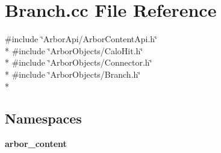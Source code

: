 \section{Branch.\+cc File Reference}
\label{Branch_8cc}
{\ttfamily \#include \char`\"{}Arbor\+Api/\+Arbor\+Content\+Api.\+h\char`\"{}}\\*
{\ttfamily \#include \char`\"{}Arbor\+Objects/\+Calo\+Hit.\+h\char`\"{}}\\*
{\ttfamily \#include \char`\"{}Arbor\+Objects/\+Connector.\+h\char`\"{}}\\*
{\ttfamily \#include \char`\"{}Arbor\+Objects/\+Branch.\+h\char`\"{}}\\*
\subsection*{Namespaces}
\begin{DoxyCompactItemize}
\item 
 {\bf arbor\+\_\+content}
\end{DoxyCompactItemize}
